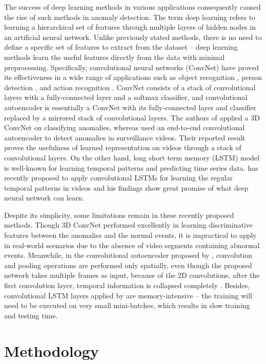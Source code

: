 \documentclass[a4paper]{article}
\begin{document}
The success of deep learning methods in various applications consequently caused the rise of such methods in anomaly detection. The term deep learning refers to learning a hierarchical set of features through multiple layers of hidden nodes in an artificial neural network. Unlike previously stated methods, there is no need to define a specific set of features to extract from the dataset -- deep learning methods learn the useful features directly from the data with minimal preprocessing. Specifically, convolutional neural networks (ConvNet) have proved its effectiveness in a wide range of applications such as object recognition \cite{simonyan2014obj}, person detection \cite{vu2016}, and action recognition \cite{tran2016,simonyan2014vid}. ConvNet consists of a stack of convolutional layers with a fully-connected layer and a softmax classifier, and convolutional autoencoder is essentially a ConvNet with its fully-connected layer and classifier replaced by a mirrored stack of convolutional layers. The authors of \cite{zhou2016} applied a 3D ConvNet on classifying anomalies, whereas \cite{hasan2016} used an end-to-end convolutional autoencoder to detect anomalies in surveillance videos. Their reported result proves the usefulness of learned representation on videos through a stack of convolutional layers. On the other hand, long short term memory (LSTM) model is well-known for learning temporal patterns and predicting time series data. \cite{medel2016} has recently proposed to apply convolutional LSTMs for learning the regular temporal patterns in videos and his findings show great promise of what deep neural network can learn.

Despite its simplicity, some limitations remain in these recently proposed methods. Though 3D ConvNet performed excellently in learning discriminative features between the anomalies and the normal events, it is impractical to apply in real-world scenarios due to the absence of video segments containing abnormal events. Meanwhile, in the convolutional autoencoder proposed by \cite{hasan2016}, convolution and pooling operations are performed only spatially, even though the proposed network takes multiple frames as input, because of the 2D convolutions, after the first convolution layer, temporal information is collapsed completely \cite{tran2016}. Besides, convolutional LSTM layers applied by \cite{medel2016} are memory-intensive -- the training will need to be executed on very small mini-batches, which results in slow training and testing time.

\section{Methodology}
\end{document}
